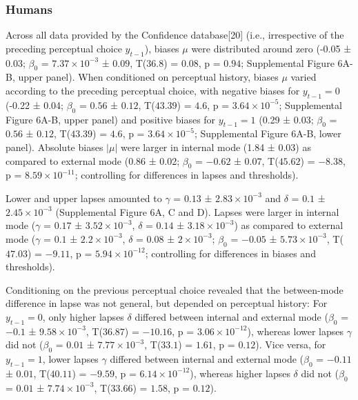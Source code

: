 \documentclass[
]{article}
\begin{document}
\hypertarget{humans}{%
\subsubsection{Humans}\label{humans}}

Across all data provided by the Confidence database{[}20{]} (i.e.,
irrespective of the preceding perceptual choice \(y_{t-1}\)), biases
\(\mu\) were distributed around zero (-0.05 ± 0.03; \(\beta_0\) =
\(\ensuremath{7.37\times 10^{-3}}\) ± \(0.09\), T(\(36.8\)) = \(0.08\),
p = \(0.94\); Supplemental Figure 6A-B, upper panel). When conditioned
on perceptual history, biases \(\mu\) varied according to the preceding
perceptual choice, with negative biases for \(y_{t-1} = 0\) (-0.22 ±
0.04; \(\beta_0\) = \(0.56\) ± \(0.12\), T(\(43.39\)) = \(4.6\), p =
\(\ensuremath{3.64\times 10^{-5}}\); Supplemental Figure 6A-B, upper
panel) and positive biases for \(y_{t-1} = 1\) (0.29 ± 0.03; \(\beta_0\)
= \(0.56\) ± \(0.12\), T(\(43.39\)) = \(4.6\), p =
\(\ensuremath{3.64\times 10^{-5}}\); Supplemental Figure 6A-B, lower
panel). Absolute biases \(|\mu|\) were larger in internal mode (1.84 ±
0.03) as compared to external mode (0.86 ± 0.02; \(\beta_0\) = \(-0.62\)
± \(0.07\), T(\(45.62\)) = \(-8.38\), p =
\(\ensuremath{8.59\times 10^{-11}}\); controlling for differences in
lapses and thresholds).

Lower and upper lapses amounted to \(\gamma\) = \(0.13\) ±
\(\ensuremath{2.83\times 10^{-3}}\) and \(\delta\) = \(0.1\) ±
\(\ensuremath{2.45\times 10^{-3}}\) (Supplemental Figure 6A, C and D).
Lapses were larger in internal mode (\(\gamma\) = \(0.17\) ±
\(\ensuremath{3.52\times 10^{-3}}\), \(\delta\) = \(0.14\) ±
\(\ensuremath{3.18\times 10^{-3}}\)) as compared to external mode
(\(\gamma\) = \(0.1\) ± \(\ensuremath{2.2\times 10^{-3}}\), \(\delta\) =
\(0.08\) ± \(\ensuremath{2\times 10^{-3}}\); \(\beta_0\) = \(-0.05\) ±
\(\ensuremath{5.73\times 10^{-3}}\), T(\(47.03\)) = \(-9.11\), p =
\(\ensuremath{5.94\times 10^{-12}}\); controlling for differences in
biases and thresholds).

Conditioning on the previous perceptual choice revealed that the
between-mode difference in lapse was not general, but depended on
perceptual history: For \(y_{t-1} = 0\), only higher lapses \(\delta\)
differed between internal and external mode (\(\beta_0\) = \(-0.1\) ±
\(\ensuremath{9.58\times 10^{-3}}\), T(\(36.87\)) = \(-10.16\), p =
\(\ensuremath{3.06\times 10^{-12}}\)), whereas lower lapses \(\gamma\)
did not (\(\beta_0\) = \(0.01\) ± \(\ensuremath{7.77\times 10^{-3}}\),
T(\(33.1\)) = \(1.61\), p = \(0.12\)). Vice versa, for \(y_{t-1} = 1\),
lower lapses \(\gamma\) differed between internal and external mode
(\(\beta_0\) = \(-0.11\) ± \(0.01\), T(\(40.11\)) = \(-9.59\), p =
\(\ensuremath{6.14\times 10^{-12}}\)), whereas higher lapses \(\delta\)
did not (\(\beta_0\) = \(0.01\) ± \(\ensuremath{7.74\times 10^{-3}}\),
T(\(33.66\)) = \(1.58\), p = \(0.12\)).
\end{document}
